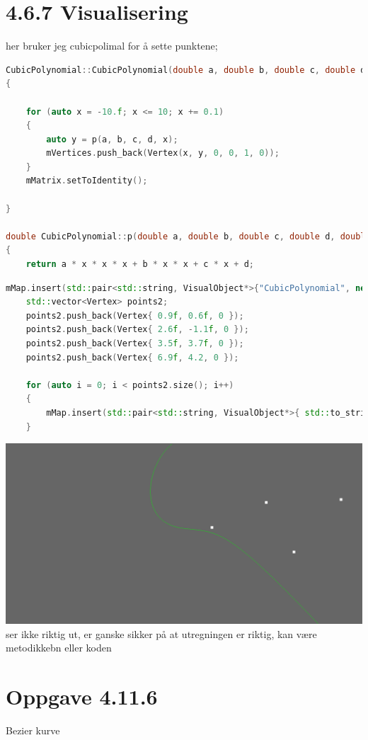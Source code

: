 \documentclass[a4paper,norsk]{article}
\begin{document}
\section{4.6.7 Visualisering}

her bruker jeg cubicpolimal for å sette punktene;
\begin{lstlisting}[language=C++, caption={cubicpolynomial.cpp}]
CubicPolynomial::CubicPolynomial(double a, double b, double c, double d, float dx)
{
   
    for (auto x = -10.f; x <= 10; x += 0.1)
    {
        auto y = p(a, b, c, d, x);
        mVertices.push_back(Vertex(x, y, 0, 0, 1, 0));
    }
    mMatrix.setToIdentity();

}

double CubicPolynomial::p(double a, double b, double c, double d, double x)
{
    return a * x * x * x + b * x * x + c * x + d;
\end{lstlisting}
\begin{lstlisting}[language=C++, caption={renderwindow.cpp}]
    mMap.insert(std::pair<std::string, VisualObject*>{"CubicPolynomial", new CubicPolynomial(-0.78, 0.69, -0.49, 0.54, 0.1f)});
    std::vector<Vertex> points2;
    points2.push_back(Vertex{ 0.9f, 0.6f, 0 });
    points2.push_back(Vertex{ 2.6f, -1.1f, 0 });
    points2.push_back(Vertex{ 3.5f, 3.7f, 0 });
    points2.push_back(Vertex{ 6.9f, 4.2, 0 });

    for (auto i = 0; i < points2.size(); i++) 
    {
        mMap.insert(std::pair<std::string, VisualObject*>{ std::to_string(i * 10), new VisualPoint(points2)});
    }
\end{lstlisting}

\centering
\includegraphics[width=\textwidth]{kurve2}
ser ikke riktig ut, er ganske sikker på at utregningen er riktig, kan være metodikkebn eller koden

\section{Oppgave 4.11.6}
Bezier kurve
\end{document}
